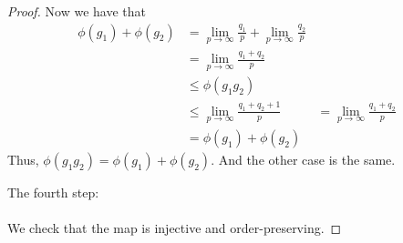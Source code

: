 \begin{proof}
Now we have that
\begin{align*}
\phi(g_1) + \phi(g_2) &= \lim_{p\to \infty} \frac{q_1}{p} + \lim_{p\to\infty} \frac{q_2}{p}\\
&= \lim_{p\to\infty} \frac{q_1+q_2}{p}\\
&\le \phi(g_1g_2)\\
&\le \lim_{p\to\infty} \frac{q_1+q_2 + 1}{p}
&= \lim_{p\to\infty} \frac{q_1+q_2}{p}\\
&= \phi(g_1)+\phi(g_2)
\end{align*}
Thus, $\phi(g_1g_2) = \phi(g_1) + \phi(g_2)$.
And the other case is the same.

The fourth step:\\ \\
We check that the map is injective and order-preserving.
\end{proof}